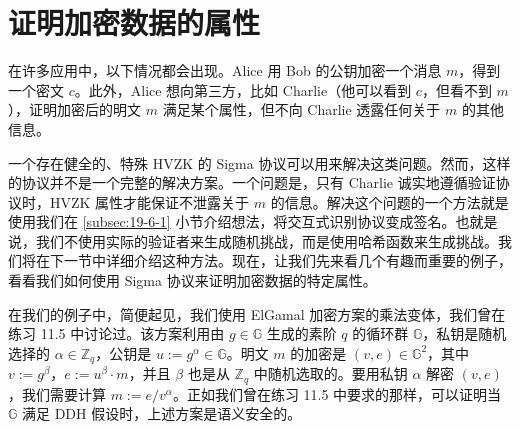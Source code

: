 \section{证明加密数据的属性}\label{sec:20-2}

在许多应用中，以下情况都会出现。Alice 用 Bob 的公钥加密一个消息 $m$，得到一个密文 $c$。此外，Alice 想向第三方，比如 Charlie（他可以看到 $c$，但看不到 $m$），证明加密后的明文 $m$ 满足某个属性，但不向 Charlie 透露任何关于 $m$ 的其他信息。

一个存在健全的、特殊 HVZK 的 Sigma 协议可以用来解决这类问题。然而，这样的协议并不是一个完整的解决方案。一个问题是，只有 Charlie 诚实地遵循验证协议时，HVZK 属性才能保证不泄露关于 $m$ 的信息。解决这个问题的一个方法就是使用我们在 \ref{subsec:19-6-1} 小节介绍想法，将交互式识别协议变成签名。也就是说，我们不使用实际的验证者来生成随机挑战，而是使用哈希函数来生成挑战。我们将在下一节中详细介绍这种方法。现在，让我们先来看几个有趣而重要的例子，看看我们如何使用 Sigma 协议来证明加密数据的特定属性。

在我们的例子中，简便起见，我们使用 ElGamal 加密方案的乘法变体，我们曾在练习 11.5 中讨论过。该方案利用由 $g\in\mathbb{G}$ 生成的素阶 $q$ 的循环群 $\mathbb{G}$，私钥是随机选择的 $\alpha\in\mathbb{Z}_q$，公钥是 $u:=g^\alpha\in\mathbb{G}$。明文 $m$ 的加密是 $(v,e)\in\mathbb{G}^2$，其中 $v:=g^\beta$，$e:=u^\beta\cdot m$，并且 $\beta$ 也是从 $\mathbb{Z}_q$ 中随机选取的。要用私钥 $\alpha$ 解密 $(v,e)$，我们需要计算 $m:={e}/{v^\alpha}$。正如我们曾在练习 11.5 中要求的那样，可以证明当 $\mathbb{G}$ 满足 DDH 假设时，上述方案是语义安全的。

